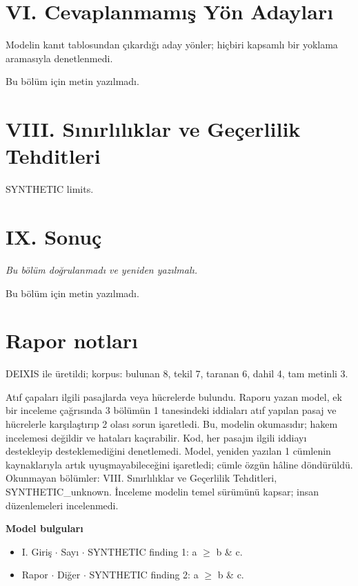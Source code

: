 \documentclass[journal]{IEEEtran}
\begin{document}
\section*{VI. Cevaplanmamış Yön Adayları}

Modelin kanıt tablosundan çıkardığı aday yönler; hiçbiri kapsamlı bir yoklama aramasıyla denetlenmedi.

Bu bölüm için metin yazılmadı.

\section*{VIII. Sınırlılıklar ve Geçerlilik Tehditleri}

SYNTHETIC limits.

\section*{IX. Sonuç}

\noindent\textit{Bu bölüm doğrulanmadı ve yeniden yazılmalı.}

Bu bölüm için metin yazılmadı.

\section*{Rapor notları}

DEIXIS ile üretildi; korpus: bulunan 8, tekil 7, taranan 6, dahil 4, tam metinli 3.

Atıf çapaları ilgili pasajlarda veya hücrelerde bulundu. Raporu yazan model, ek bir inceleme çağrısında 3 bölümün 1 tanesindeki iddiaları atıf yapılan pasaj ve hücrelerle karşılaştırıp 2 olası sorun işaretledi. Bu, modelin okumasıdır; hakem incelemesi değildir ve hataları kaçırabilir. Kod, her pasajın ilgili iddiayı destekleyip desteklemediğini denetlemedi. Model, yeniden yazılan 1 cümlenin kaynaklarıyla artık uyuşmayabileceğini işaretledi; cümle özgün hâline döndürüldü. Okunmayan bölümler: VIII. Sınırlılıklar ve Geçerlilik Tehditleri, SYNTHETIC\_unknown. İnceleme modelin temel sürümünü kapsar; insan düzenlemeleri incelenmedi.

\noindent\textbf{Model bulguları}

\begin{itemize}
\item I. Giriş \ensuremath{\cdot} Sayı \ensuremath{\cdot} SYNTHETIC finding 1: a \ensuremath{\geq} b \& c.
\item Rapor \ensuremath{\cdot} Diğer \ensuremath{\cdot} SYNTHETIC finding 2: a \ensuremath{\geq} b \& c.
\end{itemize}
\end{document}
